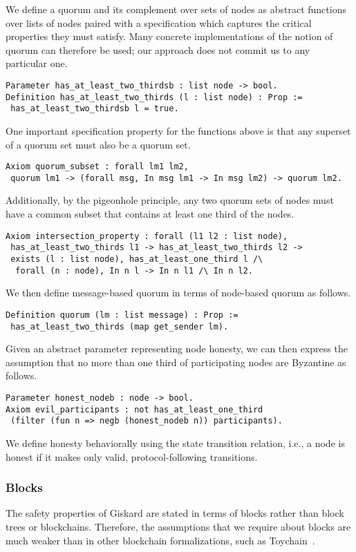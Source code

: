 \documentclass{easychair}
\begin{document}
We define a quorum and its complement over sets of nodes as abstract functions over lists of nodes paired with a specification which captures the critical properties they must satisfy. Many concrete implementations of the notion of quorum can therefore be used; our approach does not commit us to any particular one. 
\begin{lstlisting}[language=Coq]
Parameter has_at_least_two_thirdsb : list node -> bool.
Definition has_at_least_two_thirds (l : list node) : Prop :=
 has_at_least_two_thirdsb l = true.
\end{lstlisting} 
One important specification property for the functions above is that any superset of a quorum set must also be a quorum set. 
\begin{lstlisting}[language=Coq]
Axiom quorum_subset : forall lm1 lm2,
 quorum lm1 -> (forall msg, In msg lm1 -> In msg lm2) -> quorum lm2.
\end{lstlisting}
Additionally, by the pigeonhole principle, any two quorum sets of nodes must have a common subset that contains at least one third of the nodes. 
\begin{lstlisting}[language=Coq]
Axiom intersection_property : forall (l1 l2 : list node),
 has_at_least_two_thirds l1 -> has_at_least_two_thirds l2 ->
 exists (l : list node), has_at_least_one_third l /\
  forall (n : node), In n l -> In n l1 /\ In n l2.
\end{lstlisting}
We then define message-based quorum in terms of node-based quorum as follows. 
\begin{lstlisting}[language=Coq]
Definition quorum (lm : list message) : Prop :=
 has_at_least_two_thirds (map get_sender lm).
\end{lstlisting}

Given an abstract parameter representing node honesty, we can then express the assumption that no more than one third of participating nodes are Byzantine as follows. 
\begin{lstlisting}[language=Coq]
Parameter honest_nodeb : node -> bool.
Axiom evil_participants : not has_at_least_one_third
 (filter (fun n => negb (honest_nodeb n)) participants).
\end{lstlisting}

We define honesty behaviorally using the state transition relation, i.e., a node is honest if it makes only valid, protocol-following transitions.

\subsubsection{Blocks}
The safety properties of Giskard are stated in terms of blocks rather than block trees or blockchains. Therefore, the assumptions that we require about blocks are much weaker than in other blockchain formalizations, such as Toychain~\cite{Pirlea2018}.
\end{document}
